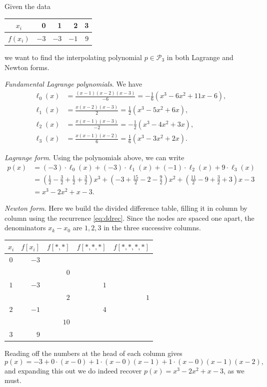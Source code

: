 \begin{example}
  Given the data
  \begin{center}
    \begin{tabular}{c|r|r|r|r}
      $x_{i}$ & 0 & 1 & 2 & 3 \\
      \hline$f\left(x_{i}\right)$ & $-3$ & $-3$ & $-1$ & 9
      \end{tabular}
  \end{center}
  we want to find the interpolating polynomial $p \in \mathcal{P}_3$ in both Lagrange and Newton forms.

  \emph{Fundamental Lagrange polynomials}. We have
  \begin{align*}
      \ell_{0}(x)&=\frac{(x-1)(x-2)(x-3)}{-6}=-\frac{1}{6}\left(x^{3}-6 x^{2}+11 x-6\right), \\
      \ell_{1}(x)&=\frac{x(x-2)(x-3)}{2}=\frac{1}{2}\left(x^{3}-5 x^{2}+6 x\right), \\
      \ell_{2}(x)&=\frac{x(x-1)(x-3)}{-2}=-\frac{1}{2}\left(x^{3}-4 x^{2}+3 x\right), \\
      \ell_{3}(x)&=\frac{x(x-1)(x-2)}{6}=\frac{1}{6}\left(x^{3}-3 x^{2}+2 x\right) .
  \end{align*}

  \emph{Lagrange form}. Using the polynomials above, we can write
  \begin{align*}
      p(x) &=(-3) \cdot \ell_{0}(x)+(-3) \cdot \ell_{1}(x)+(-1) \cdot \ell_{2}(x)+9 \cdot \ell_{3}(x) \\
      &=\left(\frac{1}{2}-\frac{3}{2}+\frac{1}{2}+\frac{3}{2}\right) x^{3}+\left(-3+\frac{15}{2}-2-\frac{9}{2}\right) x^{2}+\left(\frac{11}{2}-9+\frac{3}{2}+3\right) x-3 \\
      &=x^{3}-2 x^{2}+x-3 .
  \end{align*}

  \emph{Newton form}. Here we build the divided difference table, filling it in column by column using the recurrence \eqref{eq:ddrec}. Since the nodes are spaced one apart, the denominators $x_k - x_0$ are $1, 2, 3$ in the three successive columns.
  \begin{center}
    \begin{tabular}{crrrr}
      \toprule
      $x_i$ & $f[x_i]$ & $f[*,*]$ & $f[*,*,*]$ & $f[*,*,*,*]$\\
      \midrule
      $0$ & $-3$ \\
          &      & $0$ \\
      $1$ & $-3$ &     & $1$\\
          &      & $2$ &     & $1$\\
      $2$ & $-1$ &     & $4$\\
          &      & $10$\\
      $3$ & $9$\\
      \bottomrule
    \end{tabular}
  \end{center}
  Reading off the numbers at the head of each column gives
  $$
  p(x) = -3 + 0 \cdot (x - 0) + 1 \cdot (x-0)(x-1) + 1\cdot (x-0)(x-1)(x-2),
  $$
  and expanding this out we do indeed recover $p(x) = x^3 - 2x^2 + x - 3$, as we must.
\end{example}


